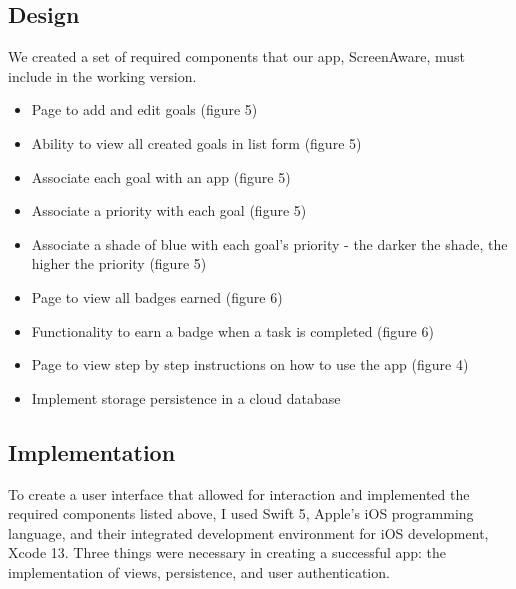 \documentclass[12pt, title page, manuscript, nonacm]{acmart}
\begin{document}
\subsection*{Design}
We created a set of required components that our app, ScreenAware, must include in the working version.
\begin{itemize}
    \item Page to add and edit goals (figure 5)
    \item Ability to view all created goals in list form (figure 5)
    \item Associate each goal with an app (figure 5)
    \item Associate a priority with each goal (figure 5)
    \item Associate a shade of blue with each goal's priority - the darker the shade, the higher the priority (figure 5)
    \item Page to view all badges earned (figure 6)
    \item Functionality to earn a badge when a task is completed (figure 6)
    \item Page to view step by step instructions on how to use the app (figure 4)
    \item Implement storage persistence in a cloud database
\end{itemize}
\subsection*{Implementation}
To create a user interface that allowed for interaction and implemented the required components listed above, I used Swift 5, Apple's iOS programming language, and their integrated development environment for iOS development, Xcode 13. Three things were necessary in creating a successful app: the implementation of views, persistence, and user authentication.
\end{document}
